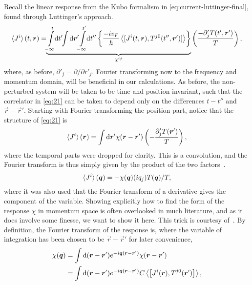 Recall the linear response from the Kubo formalism in \cref{eq:current-luttinger-final}, found through Luttinger's approach.
\begin{equation}
  \label{eq:21}
  \braket{J^i}(t, \vec{r}) = \!\!
  \underbrace{
    \int\limits_{-\infty }^{t} \!\! \mathrm{d}t' \!\!
    \int \mathrm{d}\vec{r}' \!\!
  \int\limits_{-\infty }^{t'} \!\! \mathrm{d}t''
  \left\{
    \frac{-i v_F}{\hbar }
    \Braket{
      [J^i(t, \vec{r}), T^{j 0} (t'', \vec{r}')]
    }
  \right\}
  }_{\chi^{ij}}
  \left( \frac{- \partial' _{j} T(t', \vec{r}')}{T} \right),
\end{equation}
where, as before, \( \partial'_j = \partial / \partial r'_j \).
Fourier transforming now to the frequency and momentum domain, will be beneficial in our calculations.
As before, the non-perturbed system will be taken to be time and position invariant, such that the correlator in \cref{eq:21} can be taken to depend only on the differences $t-t''$ and $\vec{r} - \vec{r}' $.
Starting with Fourier transforming the position part, notice that the structure of \cref{eq:21} is
\[
  \braket{J^i}(\vec{r}) = \int \mathrm{d} \vec{r}' \chi (\vec{r} - \vec{r}') \left(-\frac{\partial _j' T(\vec{r}')}{ T} \right),
\]
where the temporal parts were dropped for clarity.
This is a convolution, and the Fourier transform is thus simply given by the product of the two factors~\cite{rottmannMatematiskFormelsamling1995}.
\begin{equation}
  \braket{J^i}(\vec{q}) = -
  \chi (\vec{q}) (iq_j) T(\vec{q}) /T,
\end{equation}
where it was also used that the Fourier transform of a derivative gives the component of the variable.
Showing explicitly how to find the form of the response $\chi $ in momentum space is often overlooked in much literature, and as it does involve some finesse, we want to show it here.
This trick is courtesy of~\textcite{changLectureNotesManybody2018}.
By definition, the Fourier transform of the response is, where the variable of integration has been chosen to be $\vec{r}-\vec{r}'$ for later convenience,
\begin{align}
  \chi (\vec{q}) &= \int \mathrm{d}(\vec{r} - \vec{r}') e^{-i\vec{q}(\vec{r}-\vec{r}')} \chi (\vec{r} - \vec{r}')\\
                 &= \int \mathrm{d}(\vec{r} - \vec{r}') e^{-i\vec{q}(\vec{r}-\vec{r}')} C \Braket{
                   \left[
J^i (\vec{r}), T^{j 0}(\vec{r}')
                   \right]},\\
\end{align}
